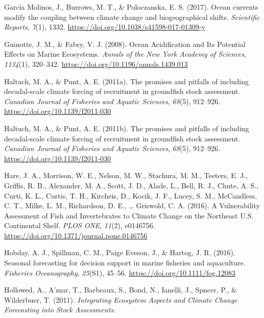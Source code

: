 \documentclass[
  12pt,
]{article}
\newlength{\cslhangindent}
\newenvironment{CSLReferences}[2] %
 {\begin{list}{}{%
  \setlength{\itemindent}{0pt}
  \setlength{\leftmargin}{0pt}
  \setlength{\parsep}{0pt}
  \ifodd #1
   \setlength{\leftmargin}{\cslhangindent}
   \setlength{\itemindent}{-1\cslhangindent}
  \fi
  \setlength{\itemsep}{#2\baselineskip}}}
 {\end{list}}
\begin{document}
\begin{CSLReferences}{1}{2}
García Molinos, J., Burrows, M. T., \& Poloczanska, E. S. (2017). Ocean currents modify the coupling between climate change and biogeographical shifts. \emph{Scientific Reports}, \emph{7}(1), 1332. \url{https://doi.org/10.1038/s41598-017-01309-y}

Guinotte, J. M., \& Fabry, V. J. (2008). Ocean Acidification and Its Potential Effects on Marine Ecosystems. \emph{Annals of the New York Academy of Sciences}, \emph{1134}(1), 320--342. \url{https://doi.org/10.1196/annals.1439.013}

Haltuch, M. A., \& Punt, A. E. (2011a). The promises and pitfalls of including decadal-scale climate forcing of recruitment in groundfish stock assessment. \emph{Canadian Journal of Fisheries and Aquatic Sciences}, \emph{68}(5), 912--926. \url{https://doi.org/10.1139/f2011-030}

Haltuch, M. A., \& Punt, A. E. (2011b). The promises and pitfalls of including decadal-scale climate forcing of recruitment in groundfish stock assessment. \emph{Canadian Journal of Fisheries and Aquatic Sciences}, \emph{68}(5), 912--926. \url{https://doi.org/10.1139/f2011-030}

Hare, J. A., Morrison, W. E., Nelson, M. W., Stachura, M. M., Teeters, E. J., Griffis, R. B., Alexander, M. A., Scott, J. D., Alade, L., Bell, R. J., Chute, A. S., Curti, K. L., Curtis, T. H., Kircheis, D., Kocik, J. F., Lucey, S. M., McCandless, C. T., Milke, L. M., Richardson, D. E., \ldots{} Griswold, C. A. (2016). A Vulnerability Assessment of Fish and Invertebrates to Climate Change on the Northeast U.S. Continental Shelf. \emph{PLOS ONE}, \emph{11}(2), e0146756. \url{https://doi.org/10.1371/journal.pone.0146756}

Hobday, A. J., Spillman, C. M., Paige Eveson, J., \& Hartog, J. R. (2016). Seasonal forecasting for decision support in marine fisheries and aquaculture. \emph{Fisheries Oceanography}, \emph{25}(S1), 45--56. \url{https://doi.org/10.1111/fog.12083}

Hollowed, A., A'mar, T., Barbeaux, S., Bond, N., Ianelli, J., Spncer, P., \& Wilderbuer, T. (2011). \emph{Integrating Ecosystem Aspects and Climate Change Forecasting into Stock Assessments}.


\end{CSLReferences}
\end{document}
